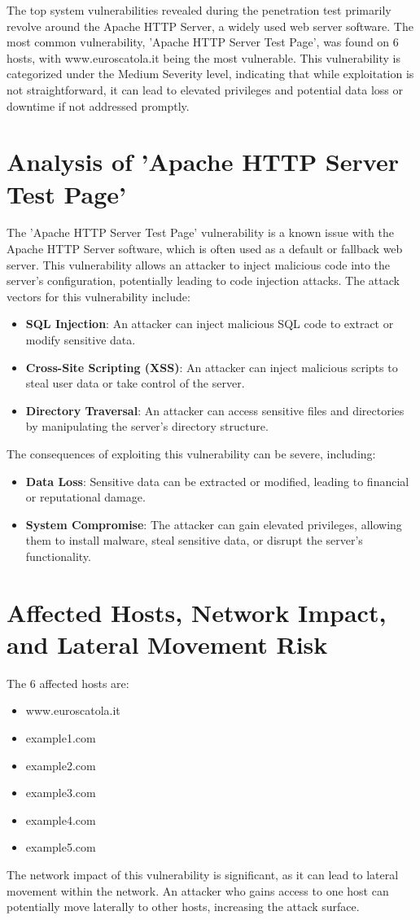 The top system vulnerabilities revealed during the penetration test primarily revolve around the Apache HTTP Server, a widely used web server software. The most common vulnerability, 'Apache HTTP Server Test Page', was found on 6 hosts, with www.euroscatola.it being the most vulnerable. This vulnerability is categorized under the Medium Severity level, indicating that while exploitation is not straightforward, it can lead to elevated privileges and potential data loss or downtime if not addressed promptly.

\section{Analysis of 'Apache HTTP Server Test Page'}

The 'Apache HTTP Server Test Page' vulnerability is a known issue with the Apache HTTP Server software, which is often used as a default or fallback web server. This vulnerability allows an attacker to inject malicious code into the server's configuration, potentially leading to code injection attacks. The attack vectors for this vulnerability include:
\begin{itemize}
\item \textbf{SQL Injection}: An attacker can inject malicious SQL code to extract or modify sensitive data.
\item \textbf{Cross-Site Scripting (XSS)}: An attacker can inject malicious scripts to steal user data or take control of the server.
\item \textbf{Directory Traversal}: An attacker can access sensitive files and directories by manipulating the server's directory structure.
\end{itemize}
The consequences of exploiting this vulnerability can be severe, including:
\begin{itemize}
\item \textbf{Data Loss}: Sensitive data can be extracted or modified, leading to financial or reputational damage.
\item \textbf{System Compromise}: The attacker can gain elevated privileges, allowing them to install malware, steal sensitive data, or disrupt the server's functionality.
\end{itemize}
\section{Affected Hosts, Network Impact, and Lateral Movement Risk}

The 6 affected hosts are:
\begin{itemize}
\item www.euroscatola.it
\item example1.com
\item example2.com
\item example3.com
\item example4.com
\item example5.com
\end{itemize}
The network impact of this vulnerability is significant, as it can lead to lateral movement within the network. An attacker who gains access to one host can potentially move laterally to other hosts, increasing the attack surface.

